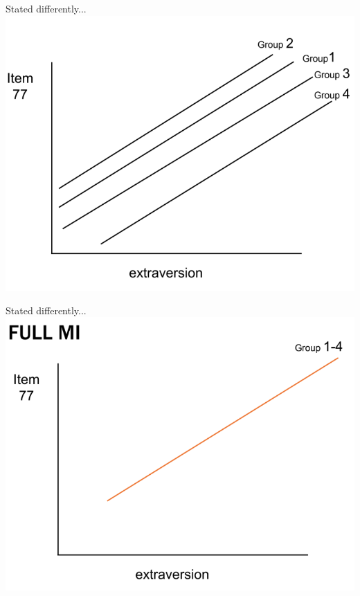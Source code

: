 \documentclass[10pt]{beamer}\usepackage[]{graphicx}\usepackage[]{xcolor}
\begin{document}
\begin{frame}{Stated differently...}
    \includegraphics[height=0.8\textheight,keepaspectratio]{images/slide114.png}
\end{frame}

\begin{frame}{Stated differently...}
    \includegraphics[height=0.8\textheight,keepaspectratio]{images/slide115.png}
\end{frame}
\end{document}
